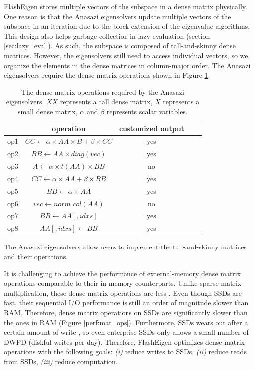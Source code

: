 FlashEigen stores multiple vectors of the subspace in a dense matrix physically.
One reason is that the Anasazi eigensolvers update multiple vectors of the subspace
in an iteration due to the block extension of the eigenvalue algorithms.
This design also helps garbage collection in lazy evaluation (section \ref{sec:lazy_eval}).
As such, the subspace is composed of tall-and-skinny dense
matrices. However, the eigensolvers still need to access individual vectors,
so we organize the elements in the dense matrices in column-major order. 
The Anasazi eigensolvers require the dense matrix operations shown in Figure
\ref{anasazi_ops}.
\begin{table}
	\begin{center}
		\small
		\begin{tabular}{|c|c|c|c|c|}
			\hline
			& operation & customized output \\
			\hline
			op1 & $CC \leftarrow \alpha \times AA \times B + \beta \times CC$ & yes \\
			\hline
			op2 & $BB \leftarrow AA \times diag(vec)$ & yes \\
			\hline
			op3 & $A \leftarrow \alpha \times t(AA) \times BB$ & no \\
			\hline
			op4 & $CC \leftarrow \alpha \times AA + \beta \times BB$ & yes \\
			\hline
			op5 & $BB \leftarrow \alpha \times AA$ & yes \\
			\hline
			op6 & $vec \leftarrow norm\_col(AA)$ & no \\
			\hline
			op7 & $BB \leftarrow AA[,idxs]$ & yes \\
			\hline
			op8 & $AA[,idxs] \leftarrow BB$ & yes \\
			\hline
		\end{tabular}
		\normalsize
	\end{center}
	\caption{The dense matrix operations required by the Anasazi eigensolvers.
		$XX$ represents a tall dense matrix, $X$ represents a small dense matrix,
	$\alpha$ and $\beta$ represents scalar variables.}
	\label{anasazi_ops}
\end{table}
The Anasazi eigensolvers allow users to implement the tall-and-skinny matrices
and their operations.

It is challenging to achieve the performance of external-memory dense matrix
operations comparable to their in-memory counterparts. Unlike sparse matrix
multiplication, these dense matrix operations are less . Even though SSDs are fast, their sequential I/O performance is
still an order of magnitude slower than RAM. Therefore, dense matrix operations
on SSDs are significantly slower than the ones in RAM (Figure \ref{perf:mat_ops}).
Furthermore, SSDs wears out after a certain amount of write \cite{}, so
even enterprise SSDs \cite{} only allows a small number of DWPD
(diskful writes per day). Therefore, FlashEigen optimizes dense matrix operations
with the following goals: \textit{(i)} reduce writes to SSDs, \textit{(ii)}
reduce reads from SSDs, \textit{(iii)} reduce computation.


